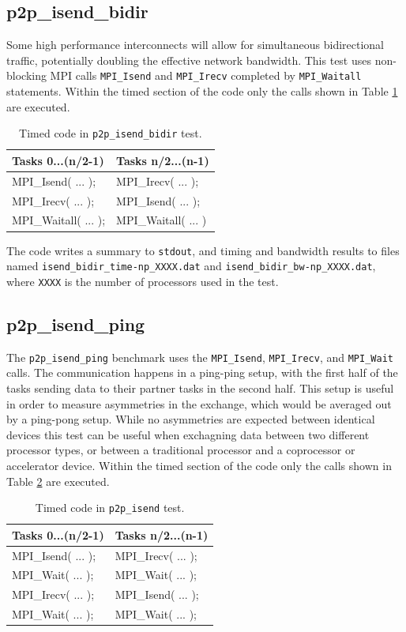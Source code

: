 \documentclass[10pt,a4paper]{report}
\begin{document}
\FloatBarrier
\subsection{p2p\_isend\_bidir}
Some high performance interconnects will allow for simultaneous bidirectional traffic, potentially doubling the effective network bandwidth. This test uses non-blocking MPI calls \verb+MPI_Isend+ and \verb+MPI_Irecv+ completed by \verb+MPI_Waitall+ statements. 
Within the timed section of the code only the calls shown in Table \ref{tab:bidir} are executed.

\begin{table}[ht]
\centering
\caption{Timed code in \texttt{p2p\_isend\_bidir} test.}
\label{tab:bidir}
\begin{tabular}{|l|l|}
\hline
\bf{Tasks 0...(n/2-1)}	& \bf{Tasks n/2...(n-1)}\\\hline
MPI\_Isend( ... );      & MPI\_Irecv( ... );\\
MPI\_Irecv( ... );      & MPI\_Isend( ... );\\
MPI\_Waitall( ... );    & MPI\_Waitall( ... )\\\hline
\end{tabular}
\end{table}

The code writes a summary to \verb+stdout+, and timing and bandwidth results to files named \verb+isend_bidir_time-np_XXXX.dat+ and \verb+isend_bidir_bw-np_XXXX.dat+, where \verb+XXXX+ is the number of processors used in the test.

\FloatBarrier
\subsection{p2p\_isend\_ping}
The \verb+p2p_isend_ping+ benchmark uses the \verb+MPI_Isend+, \verb+MPI_Irecv+, and \verb+MPI_Wait+ calls. The communication happens in a ping-ping setup, with the first half of the tasks sending data to their partner tasks in the second half. This setup is useful in order to measure asymmetries in the exchange, which would be averaged out by a ping-pong setup. While no asymmetries are expected between identical devices this test can be useful when exchagning data between two different processor types, or between a traditional processor and a coprocessor or accelerator device. Within the timed section of the code only the calls shown in Table \ref{tab:ping} are executed.

\begin{table}[ht]
\centering
\caption{Timed code in \texttt{p2p\_isend} test.}
\label{tab:ping}
\begin{tabular}{|l|l|}
\hline
\bf{Tasks 0...(n/2-1)}	& \bf{Tasks n/2...(n-1)}\\\hline
MPI\_Isend( ... );      & MPI\_Irecv( ... );\\
MPI\_Wait( ... );       & MPI\_Wait( ... );\\
MPI\_Irecv( ... );      & MPI\_Isend( ... );\\
MPI\_Wait( ... );       & MPI\_Wait( ... );\\\hline
\end{tabular}
\end{table}
\end{document}
